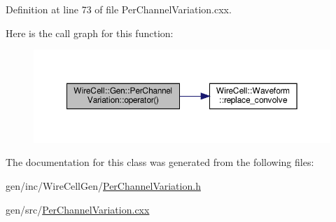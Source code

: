 Definition at line 73 of file Per\+Channel\+Variation.\+cxx.

Here is the call graph for this function\+:
\nopagebreak
\begin{figure}[H]
\begin{center}
\leavevmode
\includegraphics[width=350pt]{class_wire_cell_1_1_gen_1_1_per_channel_variation_a3748bc71e6debe59dac26df158ffb3ff_cgraph}
\end{center}
\end{figure}


The documentation for this class was generated from the following files\+:\begin{DoxyCompactItemize}
\item 
gen/inc/\+Wire\+Cell\+Gen/\hyperlink{_per_channel_variation_8h}{Per\+Channel\+Variation.\+h}\item 
gen/src/\hyperlink{_per_channel_variation_8cxx}{Per\+Channel\+Variation.\+cxx}\end{DoxyCompactItemize}

